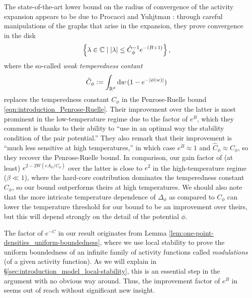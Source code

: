 \documentclass[11pt]{article}
\newcommand{\R}{\mathbb R}
\newcommand{\C}{\mathbb C}
\newcommand{\pwcc}{\Delta_{\phi}}
\newcommand{\aconst}{A_{\phi}}
\newcommand{\sconst}{B}
\newcommand{\lsconst}{C}
\newcommand{\set}[1]{\left\{#1\right\}}
\numberwithin{equation}{section}
\theoremstyle{plain}
\theoremstyle{definition}
\theoremstyle{remark}
\begin{document}
The state-of-the-art lower bound on the radius of convergence of the activity expansion appears to be due to Procacci and Yuhjtman \cite{procacci2017convergence}: through careful manipulations of the graphs that arise in the expansion, they prove convergence in the disk
\begin{equation}
\set{\lambda\in\C\mid\abs{\lambda}\le \hat{C}_{\phi}^{-1}e^{-(\sconst+1)}},
\end{equation} 
where the so-called \emph{weak temperedness contant}
\begin{equation}
\hat{C}_{\phi}:=\int_{\R^{d}}\dd{w}(1-e^{-\abs{\phi(w)}})
\end{equation} 
replaces the temperedness constant $C_{\phi}$ in the Penrose-Ruelle bound \eqref{eqn:introduction_Penrose-Ruelle}.
Their improvement over the latter is most prominent in the low-temperature regime due to the factor of $e^{\sconst}$, which they comment is thanks to their ability to ``use in an optimal way the stability condition of the pair potential.''
They also remark that their improvement is ``much less sensitive at high temperatures,'' in which case $e^{\sconst}\approx1$ and $\hat{C}_{\phi}\approx C_{\phi}$, so they recover the Penrose-Ruelle bound.
In comparison, our gain factor of (at least) $e^{2-2W(e\aconst/C_{\phi})}$ over the latter is close to $e^{2}$ in the high-temperature regime ($\beta\ll 1$), where the hard-core contribution dominates the temperedness constant $C_{\phi}$, so our bound outperforms theirs at high temperatures.
We should also note that the more intricate temperature dependence of $\pwcc$ as compared to $C_{\phi}$ can lower the temperature threshold for our bound to be an improvement over theirs, but this will depend strongly on the detail of the potential $\phi$.

The factor of $e^{-\lsconst}$ in our result originates from Lemma \ref{lem:one-point-densities_uniform-boundedness}, where we use local stability to prove the uniform boundedness of an infinite family of activity functions called \emph{modulations} (of a given activity function).
As we will explain in \S\ref{sec:introduction_model_local-stability}, this is an essential step in the argument with no obvious way around.
Thus, the improvement factor of $e^{\sconst}$ in \cite{procacci2017convergence} seems out of reach without significant new insight.
\end{document}
